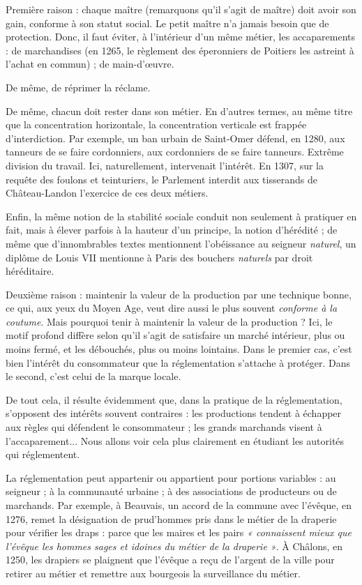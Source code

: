 \documentclass[french,twoside]{book} %
\begin{document}
\noindent Première raison : chaque maître (remarquons qu’il s’agit de maître) doit avoir son gain, conforme à son statut social. Le petit maître n’a jamais besoin que de protection. Donc, il faut éviter, à l’intérieur d’un même métier, les accaparements : de marchandises (en 1265, le règlement des éperonniers de Poitiers les astreint à l’achat en commun) ; de main-d’œuvre.\par
De même, de réprimer la réclame.\par
De même, chacun doit rester dans son métier. En d’autres termes, au même titre que la concentration horizontale, la concentration verticale est frappée d’interdiction. Par exemple, un ban urbain de Saint-Omer défend, en 1280, aux tanneurs de se faire cordonniers, aux cordonniers de se faire tanneurs. Extrême division du travail. Ici, naturellement, intervenait l’intérêt. En 1307, sur la requête des foulons et teinturiers, le Parlement interdit aux tisserands de Château-Landon l’exercice de ces deux métiers.\par
Enfin, la même notion de la stabilité sociale conduit non seulement à pratiquer en fait, mais à élever parfois à la hauteur d’un principe, la notion d’hérédité ; de même que d’innombrables textes mentionnent l’obéissance au seigneur \emph{naturel}, un diplôme de Louis VII mentionne à Paris des bouchers \emph{naturels} par droit héréditaire.\par
\bigbreak
\noindent Deuxième raison : maintenir la valeur de la production par une technique bonne, ce qui, aux yeux du Moyen Age, veut dire aussi le plus souvent \emph{conforme à la coutume}. Mais pourquoi tenir à maintenir la valeur de la production ? Ici, le motif profond diffère selon qu’il s’agit de satisfaire un marché intérieur, plus ou moins fermé, et les débouchés, plus ou moins lointains. Dans le premier cas, c’est bien l’intérêt du consommateur que la réglementation s’attache à protéger. Dans le second, c’est celui de la marque locale.\par
De tout cela, il résulte évidemment que, dans la pratique de la réglementation, s’opposent des intérêts souvent contraires : les productions tendent à échapper aux règles qui défendent le consommateur ; les grands marchands visent à l’accaparement... Nous allons voir cela plus clairement en étudiant les autorités qui réglementent.\par
La réglementation peut appartenir ou appartient pour portions variables : au seigneur ; à la communauté urbaine ; à des associations de producteurs ou de marchands. Par exemple, à Beauvais, un accord de la commune avec l’évêque, en 1276, remet la désignation de prud’hommes pris dans le métier de la draperie pour vérifier les draps : parce que les maires et les pairs \emph{« connaissent mieux que l’évêque les hommes sages et idoines du métier de la draperie »}. À Châlons, en 1250, les drapiers se plaignent que l’évêque a reçu de l’argent de la ville pour retirer au métier et remettre aux bourgeois la surveillance du métier.\par
\end{document}

